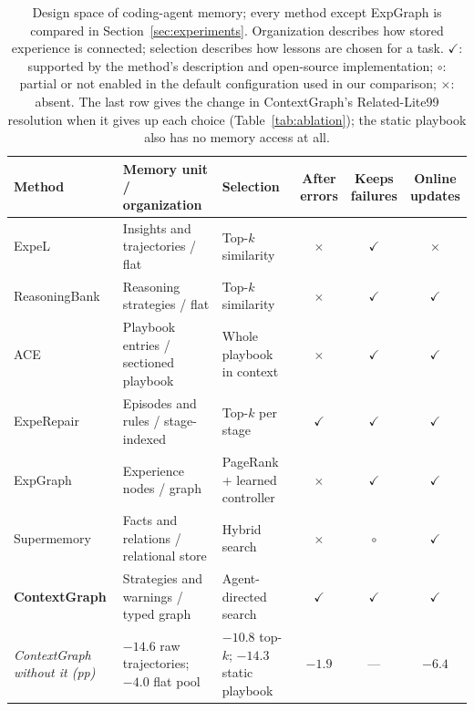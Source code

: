 \begin{table}[t]
\centering
\caption{Design space of coding-agent memory; every method except ExpGraph is
compared in Section~\ref{sec:experiments}. Organization describes how stored
experience is connected; selection describes how lessons are chosen for a
task. $\checkmark$: supported by the method's description and open-source
implementation; $\circ$: partial or not enabled in the default configuration
used in our comparison; $\times$: absent. The last row gives the change in
ContextGraph's Related-Lite99 resolution when it gives up each choice
(Table~\ref{tab:ablation}); the static playbook also has no memory access at
all.}
\label{tab:positioning}
\scriptsize
\setlength{\tabcolsep}{3.5pt}
\begin{tabular}{@{}lp{4cm}lccc@{}}
\toprule
Method & Memory unit / organization & Selection & \shortstack{After\\errors} & \shortstack{Keeps\\failures} & \shortstack{Online\\updates} \\
\midrule
ExpeL & Insights and trajectories / flat & Top-$k$ similarity & $\times$ & $\checkmark$ & $\times$ \\
ReasoningBank & Reasoning strategies / flat & Top-$k$ similarity & $\times$ & $\checkmark$ & $\checkmark$ \\
ACE & Playbook entries / sectioned playbook & Whole playbook in context & $\times$ & $\checkmark$ & $\checkmark$ \\
ExpeRepair & Episodes and rules / stage-indexed & Top-$k$ per stage & $\checkmark$ & $\checkmark$ & $\checkmark$ \\
ExpGraph & Experience nodes / graph & PageRank + learned controller & $\times$ & $\checkmark$ & $\checkmark$ \\
Supermemory & Facts and relations / relational store & Hybrid search & $\times$ & $\circ$ & $\checkmark$ \\
\textbf{ContextGraph} & Strategies and warnings / typed graph & Agent-directed search & $\checkmark$ & $\checkmark$ & $\checkmark$ \\
\midrule
\emph{ContextGraph without it (pp)} & $-14.6$ raw trajectories; $-4.0$ flat pool & $-10.8$ top-$k$; $-14.3$ static playbook & $-1.9$ & --- & $-6.4$ \\
\bottomrule
\end{tabular}
\end{table}

